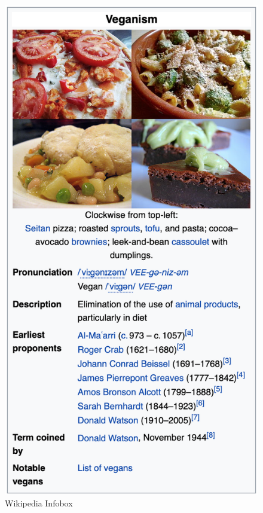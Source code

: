 \documentclass[a4paper]{article}
\begin{document}
\begin{figure}[H]
  \begin{minipage}[b]{0.4\textwidth}
    \includegraphics[width=\textwidth]{imgs/infobox}
    \caption{Wikipedia Infobox}
    \label{fig:infobox}
  \end{minipage}
\end{figure}
\end{document}
